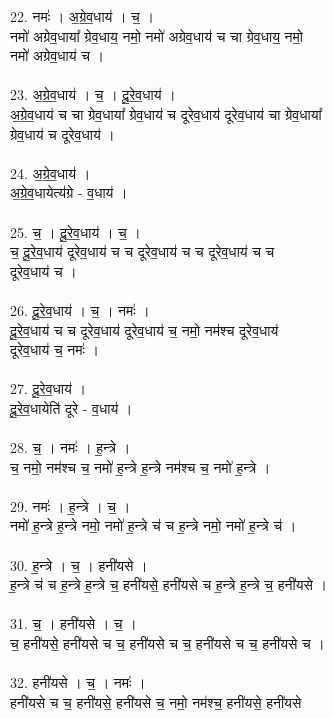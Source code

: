 22. नमः॑ । अ॒ग्रे॒व॒धाय॑ । च॒ ।\\
नमो॑ अग्रेव॒धाया᳚ ग्रेव॒धाय॒ नमो॒ नमो॑ अग्रेव॒धाय॑ च चा ग्रेव॒धाय॒ नमो॒\\
नमो॑ अग्रेव॒धाय॑ च ।\\
\\
23. अ॒ग्रे॒व॒धाय॑ । च॒ । दू॒रे॒व॒धाय॑ ।\\
अ॒ग्रे॒व॒धाय॑ च चा ग्रेव॒धाया᳚ ग्रेव॒धाय॑ च दूरेव॒धाय॑ दूरेव॒धाय॑ चा ग्रेव॒धाया᳚\\
ग्रेव॒धाय॑ च दूरेव॒धाय॑ ।\\
\\
24. अ॒ग्रे॒व॒धाय॑ ।\\
अ॒ग्रे॒व॒धायेत्य॑ग्रे - व॒धाय॑ ।\\
\\
25. च॒ । दू॒रे॒व॒धाय॑ । च॒ ।\\
च॒ दू॒रे॒व॒धाय॑ दूरेव॒धाय॑ च च दूरेव॒धाय॑ च च दूरेव॒धाय॑ च च\\
दूरेव॒धाय॑ च ।\\
\\
26. दू॒रे॒व॒धाय॑ । च॒ । नमः॑ ।\\
दू॒रे॒व॒धाय॑ च च दूरेव॒धाय॑ दूरेव॒धाय॑ च॒ नमो॒ नम॑श्च दूरेव॒धाय॑\\
दूरेव॒धाय॑ च॒ नमः॑ ।\\
\\
27. दू॒रे॒व॒धाय॑ ।\\
दू॒रे॒व॒धायेति॑ दूरे - व॒धाय॑ ।\\
\\
28. च॒ । नमः॑ । ह॒न्त्रे ।\\
च॒ नमो॒ नम॑श्च च॒ नमो॑ ह॒न्त्रे ह॒न्त्रे नम॑श्च च॒ नमो॑ ह॒न्त्रे ।\\
\\
29. नमः॑ । ह॒न्त्रे । च॒ ।\\
नमो॑ ह॒न्त्रे ह॒न्त्रे नमो॒ नमो॑ ह॒न्त्रे च॑ च ह॒न्त्रे नमो॒ नमो॑ ह॒न्त्रे च॑ ।\\
\\
30. ह॒न्त्रे । च॒ । हनी॑यसे ।\\
ह॒न्त्रे च॑ च ह॒न्त्रे ह॒न्त्रे च॒ हनी॑यसे॒ हनी॑यसे च ह॒न्त्रे ह॒न्त्रे च॒ हनी॑यसे ।\\
\\
31. च॒ । हनी॑यसे । च॒ ।\\
च॒ हनी॑यसे॒ हनी॑यसे च च॒ हनी॑यसे च च॒ हनी॑यसे च च॒ हनी॑यसे च ।\\
\\
32. हनी॑यसे । च॒ । नमः॑ ।\\
हनी॑यसे च च॒ हनी॑यसे॒ हनी॑यसे च॒ नमो॒ नम॑श्च॒ हनी॑यसे॒ हनी॑यसे\\
